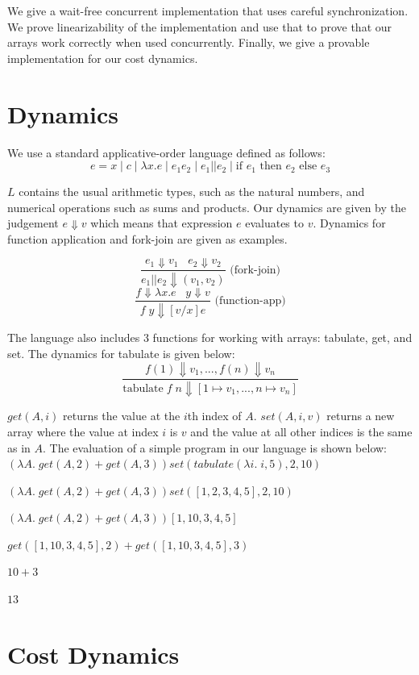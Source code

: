 \documentclass[preprint]{sigplanconf}
\begin{document}
We give a wait-free concurrent implementation that uses careful synchronization. We prove linearizability of the implementation and use that to prove that our arrays work correctly when used concurrently. Finally, we give a provable implementation for our cost dynamics.

\section{Dynamics}

We use a standard applicative-order language defined as follows:
$$e = x \; | \; c  \; | \; \lambda x.e \; | \; e_1 e_2 \; | \; e_1 || e_2 \; | \; \text{if } e_1 \text{ then } e_2 \text{ else } e_3$$

$L$ contains the usual arithmetic types, such as the natural numbers, and numerical operations such as sums and products. Our dynamics are given by the judgement $e \Downarrow v$ which means that expression $e$ evaluates to $v$. Dynamics for function application and fork-join are given as examples.

$$\frac{e_1 \Downarrow v_1 \;\;\; e_2 \Downarrow v_2}{e_1 || e_2 \Downarrow (v_1, v_2)} \text{ (fork-join)}$$
$$\frac{f \Downarrow \lambda x . e \;\;\; y \Downarrow v}{f \; y \Downarrow [v/x]e} \text{ (function-app)}$$

The language also includes 3 functions for working with arrays: tabulate, get, and set. The dynamics for tabulate is given below:
$$\frac{f(1) \Downarrow v_1, ..., f(n) \Downarrow v_n}{\text{tabulate} \; f \; n \Downarrow [1 \mapsto v_1, ..., n \mapsto v_n]}$$

$get(A,i)$ returns the value at the $i$th index of $A$. $set(A,i,v)$ returns a new array where the value at index $i$ is $v$ and the value at all other indices is the same as in $A$. The evaluation of a simple program in our language is shown below:\\

$(\lambda A. \; get(A, 2) + get(A,3)) set(tabulate(\lambda i . \; i, 5), 2, 10)$

$(\lambda A. \; get(A, 2) + get(A,3)) set([1,2,3,4,5], 2, 10)$

$(\lambda A. \; get(A, 2) + get(A,3)) [1,10,3,4,5]$

$get([1,10,3,4,5], 2) + get([1,10,3,4,5],3) $

$10+3$

$13$

\section{Cost Dynamics}
\end{document}
